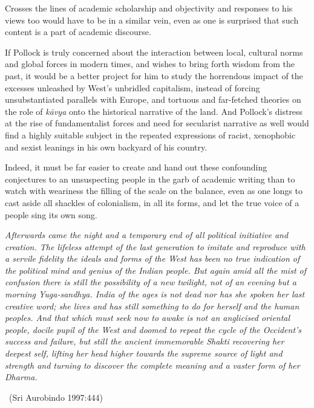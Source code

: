Crosses the lines of academic scholarship and objectivity and responses to his views too would have to be in a similar vein, even as one is surprised that such content is a part of academic discourse.

If Pollock is truly concerned about the interaction between local, cultural norms and global forces in modern times, and wishes to bring forth wisdom from the past, it would be a better project for him to study the horrendous impact of the excesses unleashed by West’s unbridled capitalism, instead of forcing unsubstantiated parallels with Europe, and tortuous and far-fetched theories on the role of \textit{kāvya} onto the historical narrative of the land. And Pollock’s distress at the rise of fundamentalist forces and need for secularist narrative as well would find a highly suitable subject in the repeated expressions of racist, xenophobic and sexist leanings in his own backyard of his country.

Indeed, it must be far easier to create and hand out these confounding conjectures to an unsuspecting people in the garb of academic writing than to watch with weariness the filling of the scale on the balance, even as one longs to cast aside all shackles of colonialism, in all its forms, and let the true voice of a people sing its own song.
\begin{myquote}
\textit{Afterwards came the night and a temporary end of all political initiative and creation. The lifeless attempt of the last generation to imitate and reproduce with a servile fidelity the ideals and forms of the West has been no true indication of the political mind and genius of the Indian people. But again amid all the mist of confusion there is still the possibility of a new twilight, not of an evening but a morning Yuga-sandhya. India of the ages is not dead nor has she spoken her last creative word; she lives and has still something to do for herself and the human peoples. And that which must seek now to awake is not an anglicised oriental people, docile pupil of the West and doomed to repeat the cycle of the Occident’s success and failure, but still the ancient immemorable Shakti recovering her deepest self, lifting her head higher towards the supreme source of light and strength and turning to discover the complete meaning and a vaster form of her Dharma.} 

\vskip -5pt

~\hfill (Sri Aurobindo 1997:444)
\end{myquote}

